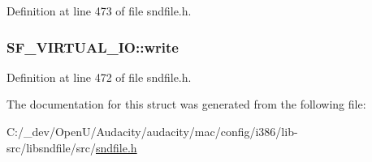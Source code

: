 Definition at line 473 of file sndfile.\+h.

\subsubsection[{\texorpdfstring{write}{write}}]{ S\+F\+\_\+\+V\+I\+R\+T\+U\+A\+L\+\_\+\+I\+O\+::write}\hypertarget{struct_s_f___v_i_r_t_u_a_l___i_o_ac99aed00fed47ac8817332e208a8cb4a}{}\label{struct_s_f___v_i_r_t_u_a_l___i_o_ac99aed00fed47ac8817332e208a8cb4a}


Definition at line 472 of file sndfile.\+h.



The documentation for this struct was generated from the following file\+:\begin{DoxyCompactItemize}
\item 
C\+:/\+\_\+dev/\+Open\+U/\+Audacity/audacity/mac/config/i386/lib-\/src/libsndfile/src/\hyperlink{mac_2config_2i386_2lib-src_2libsndfile_2src_2sndfile_8h}{sndfile.\+h}\end{DoxyCompactItemize}
